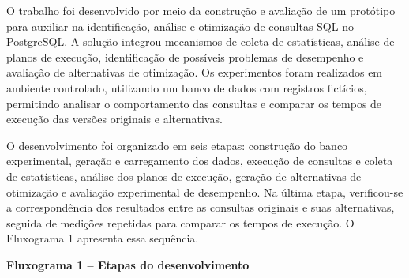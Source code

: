 \documentclass{UNESC}
\begin{document}
O trabalho foi desenvolvido por meio da construção e avaliação de um protótipo para auxiliar na identificação, análise e otimização de consultas SQL no PostgreSQL. A solução integrou mecanismos de coleta de estatísticas, análise de planos de execução, identificação de possíveis problemas de desempenho e avaliação de alternativas de otimização. Os experimentos foram realizados em ambiente controlado, utilizando um banco de dados com registros fictícios, permitindo analisar o comportamento das consultas e comparar os tempos de execução das versões originais e alternativas.


O desenvolvimento foi organizado em seis etapas: construção do banco experimental, geração e carregamento dos dados, execução de consultas e coleta de estatísticas, análise dos planos de execução, geração de alternativas de otimização e avaliação experimental de desempenho. Na última etapa, verificou-se a correspondência dos resultados entre as consultas originais e suas alternativas, seguida de medições repetidas para comparar os tempos de execução. O Fluxograma 1 apresenta essa sequência.




\begin{center}
\begin{minipage}{\linewidth}
\centering

\textbf{Fluxograma 1 -- Etapas do desenvolvimento}

\vspace{0.3cm}

\vspace{0.1cm}
\end{minipage}
\end{center}
\end{document}
